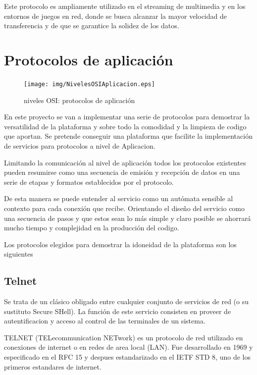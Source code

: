\documentclass[a4paper,spanish,12pt]{book}
\begin{document}
Este protocolo es ampliamente utilizado en el streaming de multimedia y en los entornos de juegos en red, donde se busca alcanzar la mayor velocidad de transferencia y de que se garantice la solidez de los datos.

\section{Protocolos de aplicación}

\begin{figure}
	\texttt{[image: img/NivelesOSIAplicacion.eps]}	
              \caption{niveles OSI: protocolos de aplicación}
  \label{fig:nivelesOSIAplicacion}
\end{figure}

En este proyecto se van a implementar una serie de protocolos para demostrar la versatilidad de la plataforma y sobre todo la comodidad y la limpieza de codigo que aportan. Se pretende conseguir una plataforma que facilite la implementación de servicios para protocolos a nivel de Aplicacion.

Limitando la comunicación al nivel de aplicación todos los protocolos existentes pueden resumirse como una secuencia de emisión y recepción de datos en una serie de etapas y formatos establecidos por el protocolo. 

De esta manera se puede entender al servicio como un autómata sensible al contexto para cada conexión que recibe. Orientando el diseño del servicio como una secuencia de pasos y que estos sean lo más simple y claro posible se ahorrará mucho tiempo y complejidad en la producción del codigo. 

Los protocolos elegidos para demostrar la idoneidad de la plataforma son los siguientes


\subsection{Telnet}
Se trata de un cl\'asico obligado entre cualquier conjunto de servicios de red (o su sustituto Secure SHell). La función de este servicio consisten en proveer de autentificacion y acceso al control de las terminales de un sistema.

TELNET (TELecommunication NETwork) es un protocolo de red utilizado en conexiones de internet o en redes de area local (LAN). Fue desarrollado en 1969 y especificado en el RFC 15 y despues estandarizado en el IETF STD 8, uno de los primeros estandares de internet.
\end{document}
